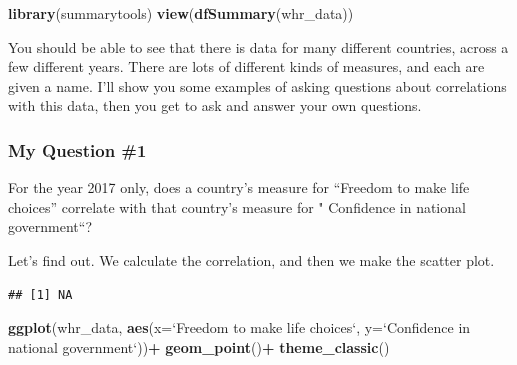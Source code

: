 \documentclass[]{book}
\newenvironment{Shaded}{\begin{snugshade}}{\end{snugshade}}
\newcommand{\KeywordTok}[1]{\textcolor[rgb]{0.13,0.29,0.53}{\textbf{#1}}}
\newcommand{\DataTypeTok}[1]{\textcolor[rgb]{0.13,0.29,0.53}{#1}}
\newcommand{\StringTok}[1]{\textcolor[rgb]{0.31,0.60,0.02}{#1}}
\newcommand{\OperatorTok}[1]{\textcolor[rgb]{0.81,0.36,0.00}{\textbf{#1}}}
\newcommand{\NormalTok}[1]{#1}
\begin{document}
\begin{Shaded}
\begin{Highlighting}[]
\KeywordTok{library}\NormalTok{(summarytools)}
\KeywordTok{view}\NormalTok{(}\KeywordTok{dfSummary}\NormalTok{(whr_data))}
\end{Highlighting}
\end{Shaded}

You should be able to see that there is data for many different
countries, across a few different years. There are lots of different
kinds of measures, and each are given a name. I'll show you some
examples of asking questions about correlations with this data, then you
get to ask and answer your own questions.

\subsubsection{My Question \#1}\label{my-question-1}

For the year 2017 only, does a country's measure for ``Freedom to make
life choices'' correlate with that country's measure for " Confidence in
national government``?

Let's find out. We calculate the correlation, and then we make the
scatter plot.

\begin{Shaded}
\end{Shaded}

\begin{verbatim}
## [1] NA
\end{verbatim}

\begin{Shaded}
\begin{Highlighting}[]
\KeywordTok{ggplot}\NormalTok{(whr_data, }\KeywordTok{aes}\NormalTok{(}\DataTypeTok{x=}\StringTok{`}\DataTypeTok{Freedom to make life choices}\StringTok{`}\NormalTok{,}
                     \DataTypeTok{y=}\StringTok{`}\DataTypeTok{Confidence in national government}\StringTok{`}\NormalTok{))}\OperatorTok{+}
\StringTok{  }\KeywordTok{geom_point}\NormalTok{()}\OperatorTok{+}
\StringTok{  }\KeywordTok{theme_classic}\NormalTok{()}
\end{Highlighting}
\end{Shaded}
\end{document}
